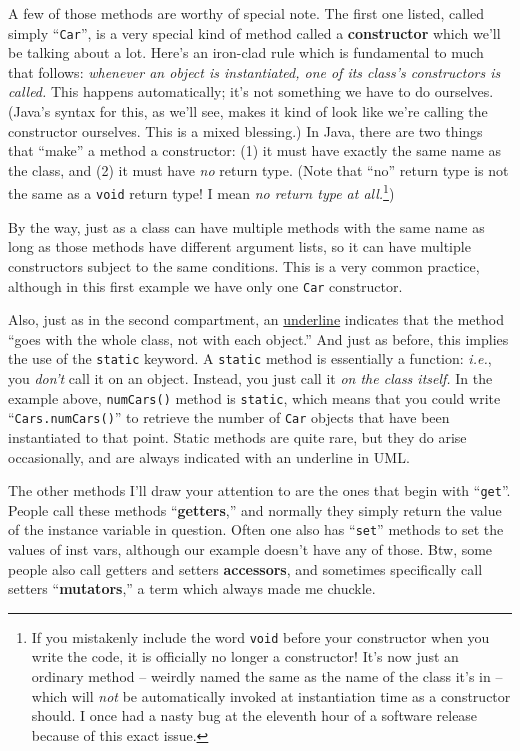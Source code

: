 A few of those methods are worthy of special note. The first one listed, called
simply ``\texttt{Car}'', is a very special kind of method called a
\textbf{constructor} which we'll be talking about a lot. Here's an iron-clad
rule which is fundamental to much that follows: \textit{whenever an object is
instantiated, one of its class's constructors is called.} This happens
automatically; it's not something we have to do ourselves. (Java's syntax for
this, as we'll see, makes it kind of look like we're calling the constructor
ourselves. This is a mixed blessing.) In Java, there are two things that
``make'' a method a constructor: (1) it must have exactly the same name as the
class, and (2) it must have \textit{no} return type. (Note that ``no'' return
type is not the same as a \texttt{void} return type! I mean \textit{no return
type at all.}\footnote{If you mistakenly include the word \texttt{void} before
your constructor when you write the code, it is officially no longer a
constructor! It's now just an ordinary method -- weirdly named the same as the
name of the class it's in -- which will \textit{not} be automatically invoked
at instantiation time as a constructor should. I once had a nasty bug at the
eleventh hour of a software release because of this exact issue.})

By the way, just as a class can have multiple methods with the same name as
long as those methods have different argument lists, so it can have multiple
constructors subject to the same conditions. This is a very common practice,
although in this first example we have only one \texttt{Car} constructor.

Also, just as in the second compartment, an \underline{underline} indicates
that the method ``goes with the whole class, not with each object.'' And just
as before, this implies the use of the \texttt{static} keyword. A
\texttt{static} method is essentially a function: \textit{i.e.}, you
\textit{don't} call it on an object. Instead, you just call it \textit{on the
class itself.} In the example above, \texttt{numCars()} method is
\texttt{static}, which means that you could write ``\texttt{Cars.numCars()}''
to retrieve the number of \texttt{Car} objects that have been instantiated to
that point. Static methods are quite rare, but they do arise occasionally, and
are always indicated with an underline in UML.

The other methods I'll draw your attention to are the ones that begin with
``\texttt{get}''. People call these methods ``\textbf{getters},'' and normally
they simply return the value of the instance variable in question. Often one
also has ``\texttt{set}'' methods to set the values of inst vars, although our
example doesn't have any of those. Btw, some people also call getters and
setters \textbf{accessors}, and sometimes specifically call setters
``\textbf{mutators},'' a term which always made me chuckle.

